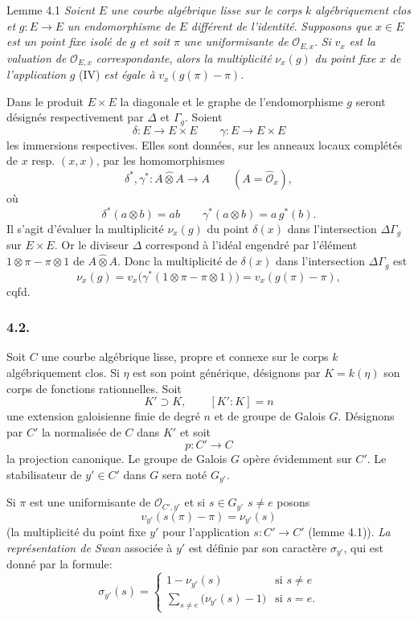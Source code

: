 \begin{statement}{Lemme 4.1}
\emph{Soient} $E$ \emph{une courbe algébrique lisse sur le corps} $k$ \emph{algébriquement clos et} $g:E\to E$ \emph{un endomorphisme de} $E$ \emph{différent de l'identité}. \emph{Supposons que} $x\in E$ \emph{est un point fixe isolé de} $g$ \emph{et soit} $\pi$ \emph{une uniformisante de} $\mathcal{O}_{E,x}$. \emph{Si} $v_x$ \emph{est la valuation de} $\mathcal{O}_{E,x}$ \emph{correspondante}, \emph{alors la multiplicité} $\nu_x(g)$ \emph{du point fixe} $x$ \emph{de l'application} $g$ (IV) \emph{est égale à} $v_x(g(\pi)-\pi)$.
\end{statement}


Dans le produit $E\times E$ la diagonale et le graphe de l'endomorphisme $g$ seront désignés respectivement par $\Delta$ et $\Gamma_g$. Soient
\[
\delta:E\longrightarrow E\times E\qquad
\gamma:E\longrightarrow E\times E
\]
les immersions respectives. Elles sont données, sur les anneaux locaux complétés de $x$ resp. $(x,x)$, par les homomorphismes
\[
\delta^*,\gamma^*:A\widehat\otimes A\longrightarrow A
\qquad (A=\widehat{\mathcal{O}}_x),
\]
où
\[
\delta^*(a\otimes b)=ab\qquad
\gamma^*(a\otimes b)=a\,g^*(b).
\]
Il s'agit d'évaluer la multiplicité $\nu_x(g)$ du point $\delta(x)$ dans l'intersection $\Delta\Gamma_g$ sur $E\times E$. Or le diviseur $\Delta$ correspond à l'idéal engendré par l'élément $1\otimes\pi-\pi\otimes1$ de $A\widehat\otimes A$. Donc la multiplicité de $\delta(x)$ dans l'intersection $\Delta\Gamma_g$ est
\[
\nu_x(g)=v_x\bigl(\gamma^*(1\otimes\pi-\pi\otimes1)\bigr)
      =v_x(g(\pi)-\pi),
\]
cqfd.

\subsubsection*{4.2.}

Soit $C$ une courbe algébrique lisse, propre et connexe sur le corps $k$ algébriquement clos. Si $\eta$ est son point générique, désignons par $K=k(\eta)$ son corps de fonctions rationnelles.
Soit
\[
K'\supset K,\qquad [K':K]=n
\]
une extension galoisienne finie de degré $n$ et de groupe de Galois $G$. Désignons par $C'$ la normalisée de $C$ dans $K'$ et soit
\[
p:C'\longrightarrow C
\]
la
projection canonique. Le groupe de Galois $G$ opère évidemment sur $C'$. Le stabilisateur de $y'\in C'$ dans $G$ sera noté $G_{y'}$.

Si $\pi$ est une uniformisante de $\mathcal{O}_{C',y'}$ et si $s\in G_{y'}$ $s\ne e$ posons
\[
v_{y'}(s(\pi)-\pi)=\nu_{y'}(s)
\tag{4.2.1}
\]
(la multiplicité du point fixe $y'$ pour l'application $s:C'\to C'$ (lemme 4.1)).
\emph{La représentation de Swan} associée à $y'$ est définie par son caractère $\sigma_{y'}$, qui est donné par la formule:
\[
\sigma_{y'}(s)=
\begin{cases}
1-\nu_{y'}(s)& \text{si } s\ne e\\[0.4em]
\displaystyle\sum_{s\ne e}\bigl(\nu_{y'}(s)-1\bigr)& \text{si } s=e.
\end{cases}
\tag{4.2.2}
\]

